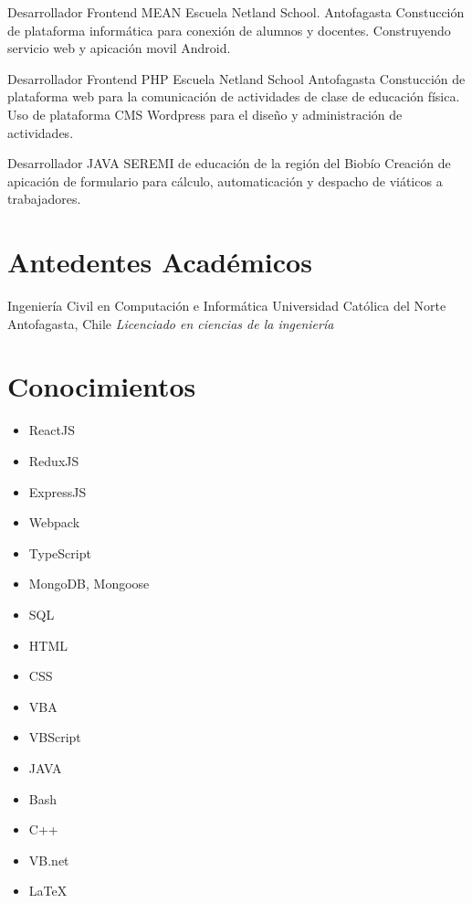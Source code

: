 \documentclass[draft,color,12pt,letterpaper,sans]{moderncv}
\begin{document}
{Desarrollador Frontend MEAN}
{Escuela Netland School.}
{Antofagasta}
{}
{Constucci\'on de plataforma inform\'atica para conexi\'on de alumnos y docentes. Construyendo servicio web y apicaci\'on movil Android.\newline}

{Desarrollador Frontend PHP}
{Escuela Netland School}
{Antofagasta}
{}
{Constucci\'on de plataforma web para la comunicaci\'on de actividades de clase de educaci\'on f\'isica. Uso de plataforma CMS Wordpress para el dise\~no y administraci\'on de actividades.\newline}

{Desarrollador JAVA}
{SEREMI de educación de la región del Biobío}
{}
{}
{Creaci\'on de apicaci\'on de formulario para c\'alculo, automaticaci\'on y despacho de vi\'aticos a trabajadores.\newline}


\section{Antedentes Acad\'emicos}
{Ingenier\'ia Civil en Computaci\'on e Inform\'atica}
{Universidad Cat\'olica del Norte}
{Antofagasta, Chile}
{\textit{Licenciado en ciencias de la ingenier\'ia}}
{}


\section{Conocimientos}
\begin{cvcolumns}

	{
		\begin{itemize}
			\item
				ReactJS
			\item
				ReduxJS
			\item
				ExpressJS
			\item
				Webpack
			\item
				TypeScript
			\item
				MongoDB, Mongoose
			\item
				SQL
			\item
				HTML
			\item
				CSS
			\item
				VBA
			\item	
				VBScript
			\item
				JAVA		
			\item
				Bash
			\item
				C++
			\item
				VB.net
			\item
				LaTeX
		\end{itemize}
	}
	\end{cvcolumns}
\end{document}
